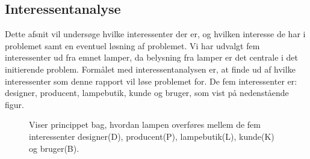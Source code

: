 \subsection{Interessentanalyse}
Dette afsnit vil undersøge hvilke interessenter der er, og hvilken interesse de har i problemet samt en eventuel løsning af problemet. Vi har udvalgt fem interessenter ud fra emnet lamper, da belysning fra lamper er det centrale i det initierende problem. Formålet med interessentanalysen er, at finde ud af hvilke interessenter som denne rapport vil løse problemet for. De fem interessenter er: designer, producent, lampebutik, kunde og bruger, som vist på nedenstående figur.



\begin{figure}[H]
	\centering
  \caption{Viser princippet bag, hvordan lampen overføres mellem de fem interessenter designer(D), producent(P), lampebutik(L), kunde(K) og bruger(B).}
  \label{fig:interessenter}
\end{figure}







